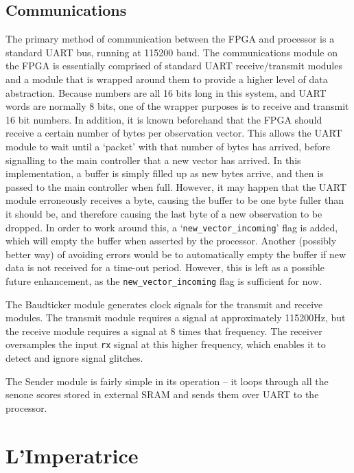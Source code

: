 	\subsection{Communications} %
	\label{sub:fpga_communications}
		The primary method of communication between the FPGA and processor is a standard UART bus, running at 115200 baud.  The communications module on the FPGA is essentially comprised of standard UART receive/transmit modules and a module that is wrapped around them to provide a higher level of data abstraction.  Because numbers are all 16 bits long in this system, and UART words are normally 8 bits, one of the wrapper purposes is to receive and transmit 16 bit numbers.  In addition, it is known beforehand that the FPGA should receive a certain number of bytes per observation vector.  This allows the UART module to wait until a `packet' with that number of bytes has arrived, before signalling to the main controller that a new vector has arrived.  In this implementation, a buffer is simply filled up as new bytes arrive, and then is passed to the main controller when full.  However, it may happen that the UART module erroneously receives a byte, causing the buffer to be one byte fuller than it should be, and therefore causing the last byte of a new observation to be dropped.  In order to work around this, a `\texttt{new\_vector\_incoming}' flag is added, which will empty the buffer when asserted by the processor.  Another (possibly better way) of avoiding errors would be to automatically empty the buffer if new data is not received for a time-out period.  However, this is left as a possible future enhancement, as the \texttt{new\_vector\_incoming} flag is sufficient for now.

		The Baudticker module generates clock signals for the transmit and receive modules.  The transmit module requires a signal at approximately 115200Hz, but the receive module requires a signal at 8 times that frequency.  The receiver oversamples the input \texttt{rx} signal at this higher frequency, which enables it to detect and ignore signal glitches.  %

		The Sender module is fairly simple in its operation -- it loops through all the senone scores stored in external SRAM and sends them over UART to the processor.



\section{L'Imperatrice} %
\label{sec:l_imperatrice_processor}

